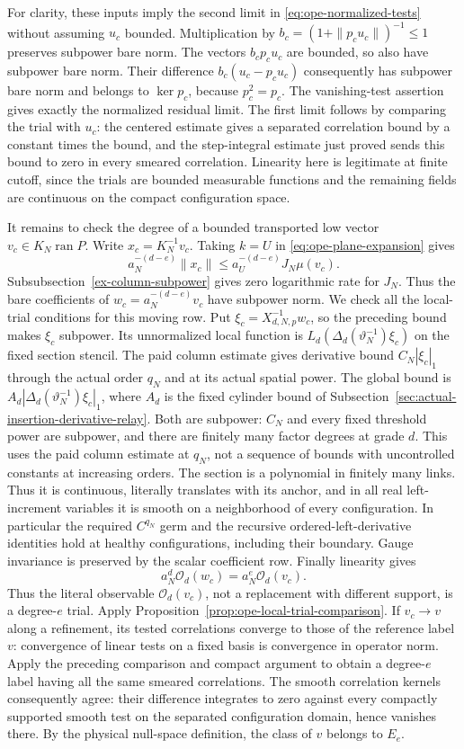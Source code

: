For clarity, these inputs imply the second limit in
\eqref{eq:ope-normalized-tests} without assuming $u_c$ bounded.
Multiplication by $b_c=(1+\|p_cu_c\|)^{-1}\leq1$ preserves subpower
bare norm. The vectors $b_cp_cu_c$ are bounded, so also have subpower
bare norm. Their difference $b_c(u_c-p_cu_c)$ consequently has
subpower bare norm and belongs to $\ker p_c$, because $p_c^2=p_c$.
The vanishing-test assertion gives exactly the normalized residual
limit. The first limit follows by comparing the trial with $u_c$:
the centered estimate gives a separated correlation bound by a
constant times the bound, and the step-integral estimate just proved
sends this bound to zero in every smeared correlation. Linearity here is legitimate at finite cutoff,
since the trials are bounded measurable functions and the remaining
fields are continuous on the compact configuration space.

It remains to check the degree of a bounded transported low vector
$v_c\in K_N\operatorname{ran}P$. Write $x_c=K_N^{-1}v_c$.
Taking $k=U$ in \eqref{eq:ope-plane-expansion} gives
\[
 a_N^{-(d-e)}\|x_c\|
 \leq a_U^{-(d-e)}J_N\mu(v_c).
\]
Subsubsection~\ref{ex-column-subpower} gives zero logarithmic rate for $J_N$. Thus the bare
coefficients of $w_c=a_N^{-(d-e)}v_c$ have subpower norm.
We check all the local-trial conditions for this moving row. Put
$\xi_c=X_{d,N,p}^{-1}w_c$, so the preceding bound makes $\xi_c$
subpower. Its unnormalized local function is
$L_d(\Delta_d(\vartheta_N^{-1})\xi_c)$ on the fixed section stencil.
The paid column estimate gives derivative bound
$C_N|\xi_c|_1$ through the actual order $q_N$ and at its actual
spatial power. The global bound is
$A_d|\Delta_d(\vartheta_N^{-1})\xi_c|_1$, where $A_d$ is the
fixed cylinder bound of
Subsection~\ref{sec:actual-insertion-derivative-relay}.
Both are subpower: $C_N$ and every fixed threshold power are
subpower, and there are finitely many factor degrees at grade $d$.
This uses the paid column estimate at $q_N$, not a sequence of
bounds with uncontrolled constants at increasing orders.
The section is a polynomial in finitely many links. Thus it is
continuous, literally translates with its anchor, and in all real
left-increment variables it is smooth on a neighborhood of every
configuration. In particular the required $C^{q_N}$ germ and the
recursive ordered-left-derivative identities hold at healthy
configurations, including their boundary. Gauge invariance is
preserved by the scalar coefficient row. Finally linearity gives
\[
 a_N^d\mathcal O_d(w_c)=a_N^e\mathcal O_d(v_c).
\]
Thus the literal observable $\mathcal O_d(v_c)$, not a replacement
with different support, is a degree-$e$ trial. Apply
Proposition~\ref{prop:ope-local-trial-comparison}.
If $v_c\to v$ along a refinement, its tested correlations converge
to those of the reference label $v$: convergence of linear tests on
a fixed basis is convergence in operator norm. Apply the preceding comparison and compact argument
to obtain a degree-$e$ label having all the same smeared correlations.
The smooth correlation kernels consequently agree: their difference
integrates to zero against every compactly supported smooth test on
the separated configuration domain, hence vanishes there. By the
physical null-space definition, the class of $v$ belongs to $E_e$.

